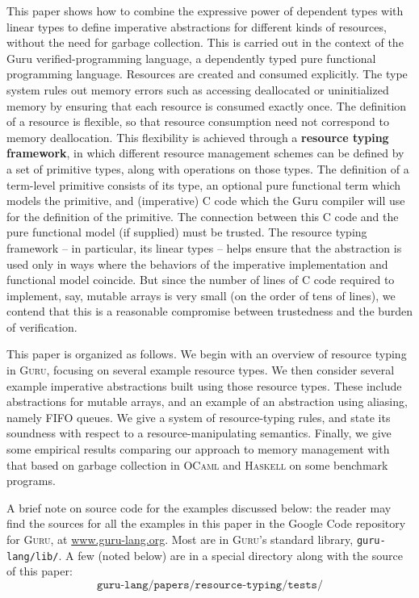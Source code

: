 \documentclass[9pt,natbib]{sigplanconf}
\begin{document}
This paper shows how to combine the expressive power of dependent
types with linear types to define imperative abstractions for
different kinds of resources, without the need for garbage collection.
This is carried out in the context of the Guru verified-programming
language, a dependently typed pure functional programming language.
Resources are created and consumed explicitly.  The type system rules
out memory errors such as accessing deallocated or uninitialized
memory by ensuring that each resource is consumed exactly once.  The
definition of a resource is flexible, so that resource consumption
need not correspond to memory deallocation.  This flexibility is
achieved through a \textbf{resource typing framework}, in which
different resource management schemes can be defined by a set of
primitive types, along with operations on those types.  The definition
of a term-level primitive consists of its type, an optional pure
functional term which models the primitive, and (imperative) C code
which the Guru compiler will use for the definition of the primitive.
The connection between this C code and the pure functional model (if
supplied) must be trusted.  The resource typing framework -- in
particular, its linear types -- helps ensure that the abstraction is
used only in ways where the behaviors of the imperative implementation
and functional model coincide.  But since the number of lines of C
code required to implement, say, mutable arrays is very small (on the
order of tens of lines), we contend that this is a reasonable
compromise between trustedness and the burden of verification.

This paper is organized as follows.  We begin with an overview of
resource typing in \textsc{Guru}, focusing on several example resource
types.  We then consider several example imperative abstractions built
using those resource types.  These include abstractions for mutable
arrays, and an example of an abstraction using aliasing, namely FIFO
queues.  We give a system of resource-typing rules, and state its
soundness with respect to a resource-manipulating semantics.  Finally,
we give some empirical results comparing our approach to memory
management with that based on garbage collection in \textsc{OCaml} and
\textsc{Haskell} on some benchmark programs.

A brief note on source code for the examples discussed below: the
reader may find the sources for all the examples in this paper in the
Google Code repository for \textsc{Guru}, at \url{www.guru-lang.org}.
Most are in \textsc{Guru}'s standard library, \texttt{guru-lang/lib/}.
A few (noted below) are in a special directory along with the source
of this paper:
\[
\texttt{guru-lang/papers/resource-typing/tests/}
\]
\end{document}
